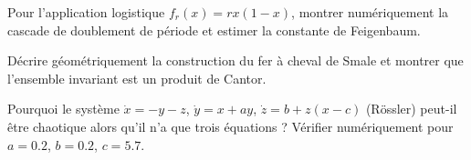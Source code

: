 \begin{exercice}[Logistique]
Pour l'application logistique $f_r(x) = rx(1-x)$, montrer num\'eriquement
la cascade de doublement de p\'eriode et estimer la constante de Feigenbaum.
\end{exercice}

\begin{exercice}
D\'ecrire g\'eom\'etriquement la construction du fer \`a cheval de Smale et
montrer que l'ensemble invariant est un produit de Cantor.
\end{exercice}

\begin{exercice}
Pourquoi le syst\`eme $\dot{x} = -y - z$, $\dot{y} = x + ay$,
$\dot{z} = b + z(x-c)$ (R\"ossler) peut-il \^etre chaotique alors qu'il
n'a que trois \'equations ? V\'erifier num\'eriquement pour $a = 0.2$,
$b = 0.2$, $c = 5.7$.
\end{exercice}
